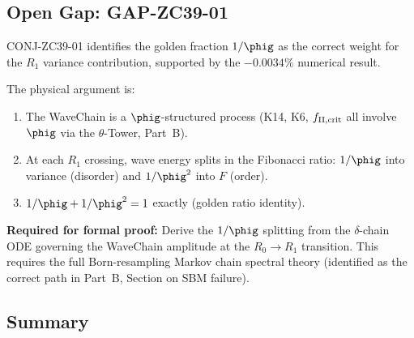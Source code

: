 \documentclass[12pt, a4paper]{article}
\begin{document}
\subsection{Open Gap: GAP-ZC39-01}
\label{sec:gap}

\begin{openqbox}[title={GAP-ZC39-01: Formal Proof of the $1/\phig$ Fraction}]
CONJ-ZC39-01 identifies the golden fraction $1/\phig$ as the
correct weight for the $R_1$ variance contribution,
supported by the $-0.0034\%$ numerical result.

The physical argument is:
\begin{enumerate}[noitemsep,leftmargin=2em]
  \item The WaveChain is a $\phig$-structured process (K14, K6, $f_{\rm II,crit}$
    all involve $\phig$ via the $\theta$-Tower, Part~B).
  \item At each $R_1$ crossing, wave energy splits in the Fibonacci ratio:
    $1/\phig$ into variance (disorder) and $1/\phig^2$ into $F$ (order).
  \item $1/\phig + 1/\phig^2 = 1$ exactly (golden ratio identity).
\end{enumerate}

\textbf{Required for formal proof:}
Derive the $1/\phig$ splitting from the $\delta$-chain ODE
governing the WaveChain amplitude at the $R_0 \to R_1$ transition.
This requires the full Born-resampling Markov chain spectral theory
(identified as the correct path in Part~B, Section on SBM failure).
\end{openqbox}

\subsection{Summary}
\label{sec:summary}
\end{document}
